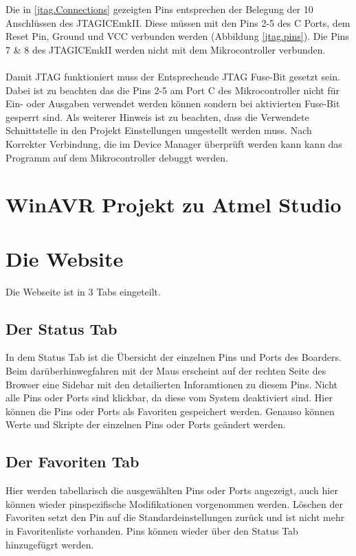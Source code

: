 Die in \ref{jtag.Connections} gezeigten Pins entsprechen der Belegung der 10
Anschlüssen des JTAGICEmkII. Diese müssen mit den Pins 2-5 des C Ports, dem
Reset Pin, Ground und VCC verbunden werden (Abbildung \ref{jtag.pins}). Die Pins 7 \& 8
des JTAGICEmkII werden nicht mit dem Mikrocontroller verbunden.\\
\\
Damit \ac{JTAG} funktioniert muss der Entsprechende JTAG Fuse-Bit gesetzt sein.
Dabei ist zu beachten das die Pins 2-5 am Port C des Mikrocontroller nicht für
Ein- oder Ausgaben verwendet werden können sondern bei aktivierten Fuse-Bit
gesperrt sind. Als weiterer Hinweis ist zu beachten, dass die Verwendete
Schnittstelle in den Projekt Einstellungen umgestellt werden muss. Nach
Korrekter Verbindung, die im Device Manager überprüft werden kann kann das
Programm auf dem Mikrocontroller debuggt werden.

\section{WinAVR Projekt zu Atmel Studio}


\section{Die Website}

Die Webseite ist in 3 Tabs eingeteilt. 

\subsection{Der Status Tab}
In dem Status Tab ist die Übersicht der
einzelnen Pins und Ports des Boarders. Beim darüberhinwegfahren mit der
Maus erscheint auf der rechten Seite des Browser eine Sidebar mit den
detailierten Inforamtionen zu diesem Pins. Nicht alle Pins oder Ports sind
klickbar, da diese vom System deaktiviert sind. Hier können die Pins oder Ports
als Favoriten gespeichert werden. Genauso können Werte und Skripte der einzelnen
Pins oder Ports geändert werden.

\subsection{Der Favoriten Tab}
Hier werden tabellarisch die ausgewählten Pins oder Ports angezeigt, auch hier
können wieder pinspezifische Modifikationen vorgenommen werden. Löschen der
Favoriten setzt den Pin auf die Standardeinstellungen zurück und ist nicht mehr
in Favoritenliste vorhanden. Pins können wieder über den Status Tab hinzugefügrt
werden.


